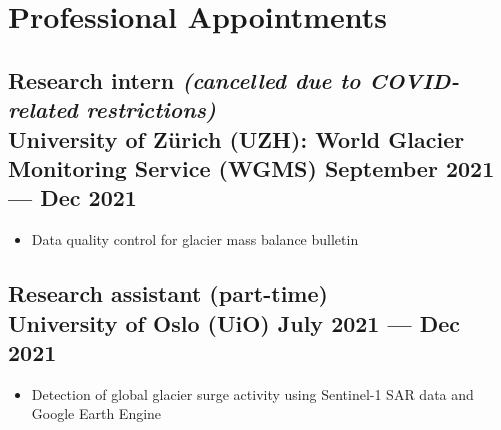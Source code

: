 \documentclass[a4,10pt]{article}
\newenvironment{zitemize}{
\begin{itemize}\itemsep2pt \parskip0pt \parsep1pt}
{\end{itemize}\vspace{-0.5cm}}
\begin{document}
\section{Professional Appointments} %


\subsection*{Research intern \textit{(cancelled due to COVID-related restrictions)} \\ University of Zürich (UZH): World Glacier Monitoring Service (WGMS)  \hfill September 2021 --- Dec 2021} 
    \begin{zitemize}
        \item Data quality control for glacier mass balance bulletin 
 
    \end{zitemize}

\subsection*{Research assistant (part-time) \\University of Oslo (UiO) \hfill July 2021 --- Dec 2021} 
    \begin{zitemize}
        \item Detection of global glacier surge activity using Sentinel-1 SAR data and Google Earth Engine 
    \end{zitemize}
\end{document}
